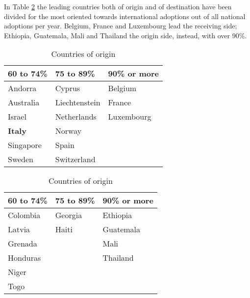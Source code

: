 
In Table \ref{tab:intadoptpercentcountries} the leading countries both of origin and of destination have been divided for the most oriented towards international adoptions out of all national adoptions per year. Belgium, France and Luxembourg lead the receiving side; Ethiopia, Guatemala, Mali and Thailand the origin side, instead, with over 90\%. 

\begin{table}[H]
    \begin{subtable}[h]{0.45\textwidth}
        \centering
        \begin{tabular}{l l l}
        60 to 74\% & 75 to 89\% & 90\% or more\\
        \hline
        Andorra & Cyprus & Belgium\\
        Australia & Liechtenstein & France\\
        Israel & Netherlands & Luxembourg\\
        \textcolor{BrickRed}{\textbf{Italy}} & Norway & \\
        Singapore & Spain & \\
        Sweden & Switzerland & \\
        \end{tabular}
        \caption{Receiving Countries}
        \label{tab:receivingcountries}
    \end{subtable}
    \hfill
    \begin{subtable}[h]{0.45\textwidth}
        \centering
        \begin{tabular}{l l l}
        60 to 74\% & 75 to 89\% & 90\% or more\\
        \hline
        Colombia & Georgia & Ethiopia\\
        Latvia & Haiti & Guatemala\\
        Grenada &  & Mali\\
        Honduras &  & Thailand\\
        Niger &  & \\
        Togo &  & \\
        \end{tabular}
        \caption{Countries of origin}
        \label{tab:countriesoforigin}
    \end{subtable}
    \label{tab:intadoptpercentcountries}
\end{table}

